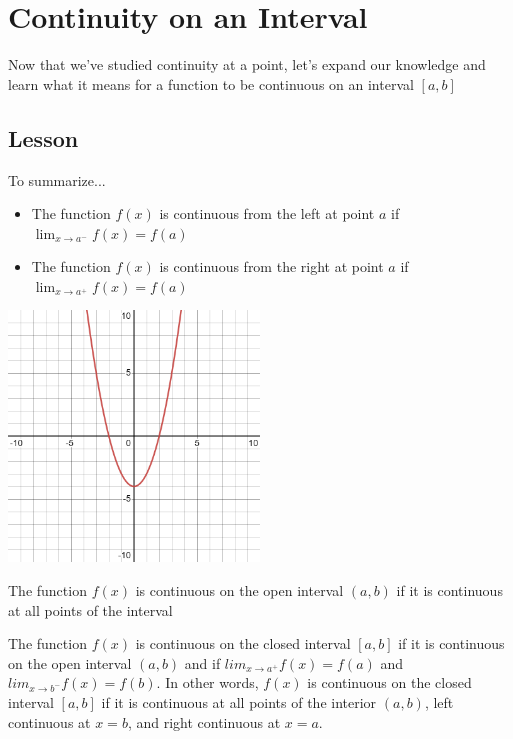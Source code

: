 \documentclass{ximera}
\begin{document}
\section{Continuity on an Interval}

Now that we've studied continuity at a point, let's expand our knowledge and learn what it means for a function to be continuous on an interval $[a,b]$

\subsection{Lesson}
\begin{center}
\end{center}

To summarize...

\begin{explanation}
    \begin{foldable}
        \begin{itemize}
            \item The function $f(x)$ is continuous from the left at point $a$ if $\lim_{x \to a^-} f(x) = f(a)$
            \item The function $f(x)$ is continuous from the right at point $a$ if $\lim_{x \to a^+} f(x) = f(a)$
        \end{itemize}
        \begin{center}            
        \includegraphics[width=0.5\textwidth]{graph4.png}
        \end{center}
    \end{foldable}

    \begin{foldable}
        The function $f(x)$ is continuous on the open interval $(a,b)$ if it is continuous at all points of the interval
    \end{foldable}

    \begin{foldable}
        The function $f(x)$ is continuous on the closed interval $[a,b]$ if it is continuous on the open interval $(a,b)$ and if $lim_{x \to a^+} f(x) = f(a)$ and $lim_{x \to b^-} f(x) = f(b)$.
        In other words, $f(x)$ is continuous on the closed interval $[a,b]$ if it is continuous at all points of the interior $(a,b)$, left continuous at $x=b$, and right continuous at $x=a$.
    \end{foldable}{}
\end{explanation}
\end{document}

